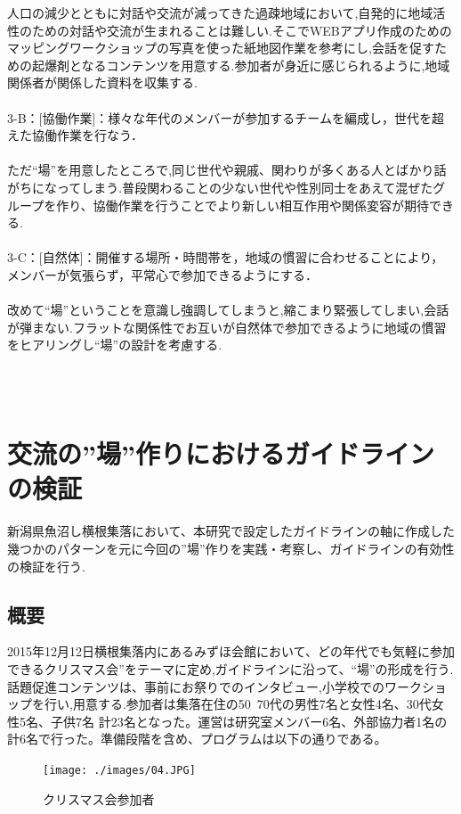 \documentclass[a4paper]{jsarticle}
\begin{document}
人口の減少とともに対話や交流が減ってきた過疎地域において,自発的に地域活性のための対話や交流が生まれることは難しい.そこでWEBアプリ作成のためのマッピングワークショップの写真を使った紙地図作業を参考にし,会話を促すための起爆剤となるコンテンツを用意する.参加者が身近に感じられるように,地域関係者が関係した資料を収集する.\\\\

3-B：[協働作業]：様々な年代のメンバーが参加するチームを編成し，世代を超えた協働作業を行なう．\\\\
ただ“場”を用意したところで,同じ世代や親戚、関わりが多くある人とばかり話がちになってしまう.普段関わることの少ない世代や性別同士をあえて混ぜたグループを作り、協働作業を行うことでより新しい相互作用や関係変容が期待できる.\\\\
3-C：[自然体]：開催する場所・時間帯を，地域の慣習に合わせることにより，メンバーが気張らず，平常心で参加できるようにする．\\\\
改めて“場”ということを意識し強調してしまうと,縮こまり緊張してしまい,会話が弾まない.フラットな関係性でお互いが自然体で参加できるように地域の慣習をヒアリングし“場”の設計を考慮する.

\\\\

\newpage
\section{交流の”場”作りにおけるガイドラインの検証}
新潟県魚沼し横根集落において、本研究で設定したガイドラインの軸に作成した幾つかのパターンを元に今回の”場”作りを実践・考察し、ガイドラインの有効性の検証を行う.

\subsection{概要}
2015年12月12日横根集落内にあるみずほ会館において、どの年代でも気軽に参加できるクリスマス会”をテーマに定め,ガイドラインに沿って、“場”の形成を行う.話題促進コンテンツは、事前にお祭りでのインタビュー,小学校でのワークショップを行い,用意する.参加者は集落在住の50~70代の男性7名と女性4名、30代女性5名、子供7名 計23名となった。運営は研究室メンバー6名、外部協力者1名の計6名で行った。準備段階を含め、プログラムは以下の通りである。\\
\begin{figure}[H]
  \begin{center}
    \texttt{[image: ./images/04.JPG]}
    \caption{クリスマス会参加者}
    \label{fig:tmu_hino}
  \end{center}
\end{figure}
\end{document}
